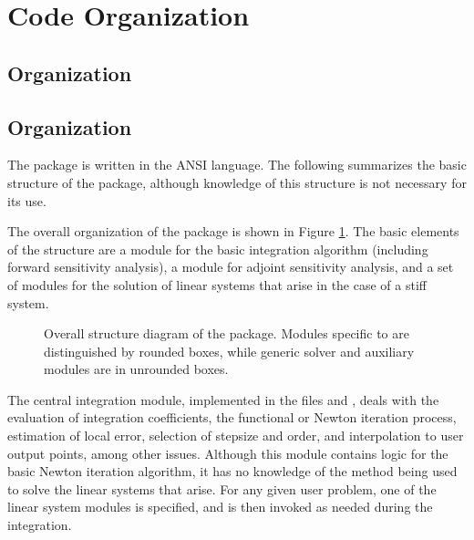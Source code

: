 \section{Code Organization}\label{s:organization}

\subsection{{\sundials} Organization}\label{ss:sun_org}


\subsection{{\cvode} Organization}\label{ss:cvodes_org}

The {\cvode} package is written in the ANSI {\C} language. The following
summarizes the basic structure of the package, although knowledge
of this structure is not necessary for its use.

The overall organization of the {\cvode} package is shown in Figure
\ref{f:cvsorg}.  The basic elements of the structure are a module for
the basic integration algorithm (including forward sensitivity analysis),
a module for adjoint sensitivity analysis, and a set of modules for the solution
of linear systems that arise in the case of a stiff system.  
\begin{figure}
\centerline{}
\caption [Overall structure diagram of the {\cvode} package]
{Overall structure diagram of the {\cvode} package.
  Modules specific to {\cvode} are distinguished by rounded boxes, while 
  generic solver and auxiliary modules are in unrounded boxes.}
\label{f:cvsorg}
\end{figure}

The central integration module, implemented in the files 
 and , deals with the evaluation of integration coefficients,
the functional or Newton iteration process, estimation of local error,
selection of stepsize and order, and interpolation to user output
points, among other issues.  Although this module contains logic for
the basic Newton iteration algorithm, it has no knowledge of the
method being used to solve the linear systems that arise.  For any
given user problem, one of the linear system modules is specified, and
is then invoked as needed during the integration. 

